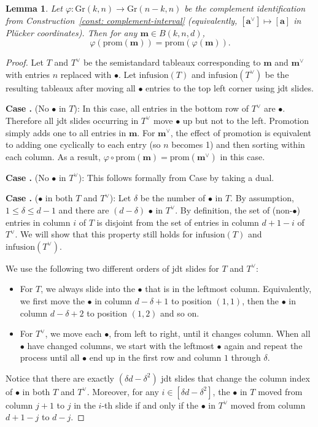 \documentclass[12pt,reqno]{amsart}
\newtheorem{lemma}{Lemma}[section]
\theoremstyle{definition}
\newcommand{\RNum}[1]{\uppercase\expandafter{\romannumeral #1\relax}}
\renewcommand{\aa}{\mathbf a}
\newcommand{\mm}{\mathbf m}
\newcommand{\gr}{\mathrm{Gr}}
\begin{document}
{\begin{lemma}\label{lemma:promcommute}
Let \(\varphi:\gr(k,n)\to \gr(n-k,n)\) be the complement identification from
Construction~\ref{const: complement-interval} (equivalently, \([\aa^\vee]\mapsto[\aa]\) in Pl\"ucker coordinates).
Then for any \(\mm\in B(k,n,d)\),
\[
\varphi(\mathrm{prom}(\mm))=\mathrm{prom}(\varphi(\mm)).
\]
\end{lemma}


\begin{proof}
    Let $T$ and $T^\vee$ be the semistandard tableaux corresponding to $\mm$ and $\mm^\vee$ with entries $n$ replaced with $\bullet$. Let $\mathrm{infusion}(T)$ and $\mathrm{infusion}(T^\vee)$ be the resulting tableaux after moving all $\bullet$ entries to the top left corner using jdt slides. 

     \noindent\textbf{Case \RNum{1}.} (No $\bullet$ in $T$): In this case, all entries in the bottom row of $T^\vee$ are $\bullet$. Therefore all jdt slides occurring in $T^\vee$ move $\bullet$ up but not to the left.
     Promotion simply adds one to all entries in $\mm$. For $\mm^\vee$, the effect of promotion is equivalent to adding one cyclically to each entry (so $n$ becomes 1) and then sorting within each column. As a result, $\varphi\circ \mathrm{prom}(\mm) = \mathrm{prom}(\mm^\vee)$ in this case.

     \noindent\textbf{Case \RNum{2}.} (No $\bullet$ in $T^\vee$):
     This follows formally from Case \RNum{1} by taking a dual.

     \noindent\textbf{Case \RNum{3}.} ($\bullet$ in both $T$ and $T^\vee$): 
    Let $\delta$ be the number of $\bullet$ in $T$. By assumption, $1\leq \delta \leq d-1$ and there are $(d-\delta)$ $\bullet$ in $T^\vee$. By definition, the set of (non-$\bullet$) entries in column $i$ of $T$ is disjoint from the set of entries in column $d+1-i$ of $T^\vee$. We will show that this property still holds for $\mathrm{infusion}(T)$ and $\mathrm{infusion}(T^\vee)$.
    
    We use the following two different orders of jdt slides for $T$ and $T^\vee$:
    \begin{itemize}
        \item[-] For $T$, we always slide into the $\bullet$ that is in the leftmost column. Equivalently, we first move the $\bullet$ in column $d-\delta+1$ to position $(1,1)$, then the $\bullet$ in column $d-\delta+2$ to position $(1,2)$ and so on. 
        \item[-] For $T^\vee$, we move each $\bullet$, from left to right, until it changes column. When all $\bullet$ have changed columns, we start with the leftmost $\bullet$ again and repeat the process until all $\bullet$ end up in the first row and column $1$ through $\delta$.
    \end{itemize}
    Notice that there are exactly $(\delta d-\delta^2)$ jdt slides that change the column index of $\bullet$ in both $T$ and $T^\vee$. Moreover, for any $i\in [\delta d-\delta^2]$, the $\bullet$ in $T$ moved from column $j+1$ to $j$ in the $i$-th slide if and only if the $\bullet$ in $T^\vee$ moved from column $d+1-j$ to $d-j$.
    

\end{proof}}
\end{document}
